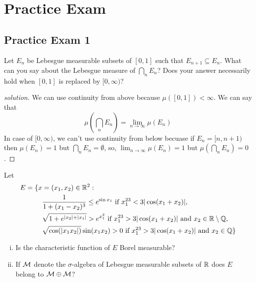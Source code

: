 \chapter{Practice Exam}
\section{Practice Exam 1}
\begin{problem}
  Let $E_n$ be Lebesgue measurable subsets of $[0, 1]$ such that $E_{n+1} \subseteq E_n$.
  What can you say about the Lebesgue measure of $\bigcap_n E_n$? Does your answer
  necessarily hold when $[0, 1]$ is replaced by $[0, \infty)$?
\end{problem}
\begin{proof}[solution]
  We can use continuity from above because $\mu([0, 1]) < \infty$.
  We can say that $$\mu\left(\bigcap_n E_n\right) = \lim_{n \to \infty} \mu(E_n)$$
  In case of $[0, \infty)$, we can't use continuity from below becuase if $E_n = [n, n+1)$
  then $\mu(E_n) = 1$ but $\bigcap_n E_n = \emptyset$, so, $\lim_{n\to \infty}\mu(E_n) = 1$ but 
  $\mu\left(\bigcap_n E_n\right) = 0$.
\end{proof}

\begin{problem}
  Let 
  \begin{align*}
    E = \{x &= (x_1, x_2) \in \mathbb R^2 : \\
    &\frac1{1 + (x_1 - x_2)^3} \le e^{\sin x_1} \text{ if } x_1^{23} < 3|\cos(x_1 + x_2)|, \\
    &\sqrt{1 + e^{|x_2| + |x_1|}} > e^{x_1^2} \text{ if } x_1^{23} > 3|\cos(x_1 + x_2)|\text{ and }x_2 \in \mathbb R\setminus\mathbb Q, \\
    &\sqrt{\cos(|x_1x_2|)}\sin(x_1x_2) > 0 \text{ if } x_1^{23} > 3|\cos(x_1 + x_2)|\text{ and }x_2 \in \mathbb Q\}
  \end{align*}
  \begin{enumerate}[(i)]
    \item Is the characteristic function of $E$ Borel measurable?
    \item If $\mathcal M$ denote the $\sigma$-algebra of Lebesgue measurable subsets of $\mathbb R$ does $E$ belong to $\mathcal M \oplus \mathcal M$?
  \end{enumerate}
\end{problem}

